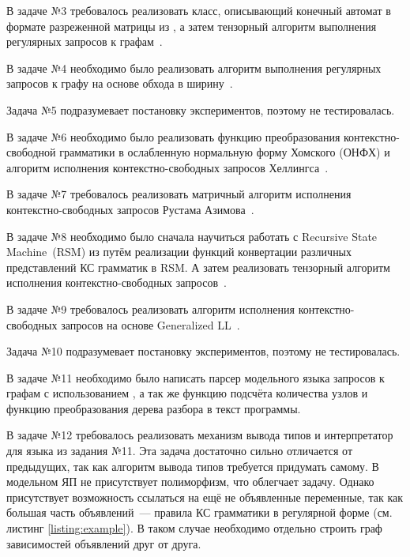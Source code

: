 В задаче №3 требовалось реализовать класс, описывающий конечный автомат в формате разреженной матрицы из \scipy{}, а затем тензорный алгоритм выполнения регулярных запросов к графам~\cite{shemetovaOneAlgorithmEvaluate2021}.

В задаче №4 необходимо было реализовать алгоритм выполнения регулярных запросов к графу на основе обхода в ширину~\cite{elekesGraphBLASSolutionSIGMOD2020}.

Задача №5 подразумевает постановку экспериментов, поэтому не тестировалась.

В задаче №6 необходимо было реализовать функцию преобразования контекстно-свободной грамматики в ослабленную нормальную форму Хомского (ОНФХ) и алгоритм исполнения контекстно-свободных запросов Хеллингса~\cite{hellingsConjunctiveContextFreePath2014}.

В задаче №7 требовалось реализовать матричный алгоритм исполнения контекстно-свободных запросов Рустама Азимова~\cite{azimovContextfreePathQuerying2018}.

В задаче №8 необходимо было сначала научиться работать с Recursive State Machine~(RSM) из \pyformlang{} путём реализации функций конвертации различных представлений КС грамматик в RSM.
А затем реализовать тензорный алгоритм исполнения контекстно-свободных запросов~\cite{orachevContextFreePathQuerying2020, shemetovaOneAlgorithmEvaluate2021}.

В задаче №9 требовалось реализовать алгоритм исполнения контекстно-свободных запросов на основе Generalized LL~\cite{abzalovGLLbasedContextFreePath2023}.

Задача №10 подразумевает постановку экспериментов, поэтому не тестировалась.

В задаче №11 необходимо было написать парсер модельного языка запросов к графам с использованием \antlr{}, а так же функцию подсчёта количества узлов и функцию преобразования дерева разбора в текст программы.

В задаче №12 требовалось реализовать механизм вывода типов и интерпретатор для языка из задания №11.
Эта задача достаточно сильно отличается от предыдущих, так как алгоритм вывода типов требуется придумать самому.
В модельном ЯП не присутствует полиморфизм, что облегчает задачу.
Однако присутствует возможность ссылаться на ещё не объявленные переменные, так как большая часть объявлений~--- правила КС грамматики в регулярной форме (см. листинг \ref{listing:example}).
В таком случае необходимо отдельно строить граф зависимостей объявлений друг от друга.

